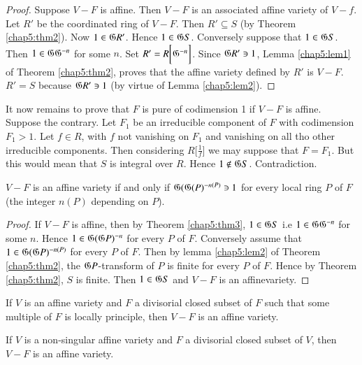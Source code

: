 \begin{proof}
  Suppose $V-F$ is affine. Then $V-F$ is an associated affine variety
  of $V-f$. Let $R'$ be the coordinated ring of $V-F$. Then $R'
  \subseteq S$ (by Theorem \ref{chap5:thm2}). Now $1 \in \mathfrak{G} R'$. Hence $1
  \in \mathfrak{G} S$. Conversely suppose that $1 \in
  \mathfrak{G} S$. Then $1 \in \mathfrak{G}  \mathfrak{G}^{-n}$ for some
  $n$. Set $R' = R  \bigg[\mathfrak{G}^{-n} \bigg ] $. Since
  $\mathfrak{G} R' \ni 1$, Lemma \ref{chap5:lem1} of Theorem \ref{chap5:thm2},
  proves that the 
  affine variety defined by $R'$ is $V-F$. $R' = S$ because
  $\mathfrak{G} R' \ni 1$ (by virtue of Lemma \ref{chap5:lem2}). 
\end{proof}  
   
 It now remains to prove that $F$ is pure of codimension 1
 if $V-F$ is affine. Suppose the contrary. Let $F_{1}$ be an
 irreducible component of $F$ with codimension $F_{1} >  1$. Let
 $f \in R $, with $f$ not vanishing on $F_1$ and vanishing on all tho
 other irreducible components. Then considering $R \bigg [\frac{1}{f}
   \bigg ]$ we may suppose that $F=F_1$. But this would mean that $S$
 is integral over $R$. Hence $1 \not\in \mathfrak{G} S$. Contradiction.  
     
 \begin{thm}\label{chap5:thm3}%
   $V-F$ is an affine variety if and only if $\mathfrak{G}(\mathfrak{G}(P)^{{-n(P)}}\ni
   1 $  for every local ring $P$ of $F$ (the  integer $n(P)$ depending
   on $P$).  
\end{thm}     
     
\begin{proof}
  If $V-F$ is affine, then by Theorem \ref{chap5:thm3}, $1 \in \mathfrak{G} S$ i.e $1
  \in \mathfrak{G} \mathfrak{G}^{-n}$  
  for some $n$. Hence $1 \in \mathfrak{G} (\mathfrak{G} P)^{-n}$ for
  every $P$ of $F$. Conversely assume that $1 \in \mathfrak{G} (\mathfrak{G} P)^{-n
    (P)}$ for every $P$ of $F$. Then by lemma \ref{chap5:lem2} of
  Theorem \ref{chap5:thm2}, the
  $\mathfrak{G} P$-transform of $P$ is finite for every $P$ of $F$. Hence
  by Theorem \ref{chap5:thm2}, $S$ is finite. Then $1\in \mathfrak{G} S$ and $V-F$ is an
  affine\pageoriginale variety. 
\end{proof} 

\setcounter{corollary}{0}
\begin{corollary}%
  If $V$ is an affine variety and $F$ a divisorial closed subset of
  $F$ such that some multiple of $F$ is locally principle, then $V-F$
  is an affine variety. 
\end{corollary}
     
\begin{corollary}%
  If $V$  is a non-singular affine variety and $F$ a divisorial
  closed subset of $V$, then $V-F$ is an affine variety. 
 \end{corollary}     

